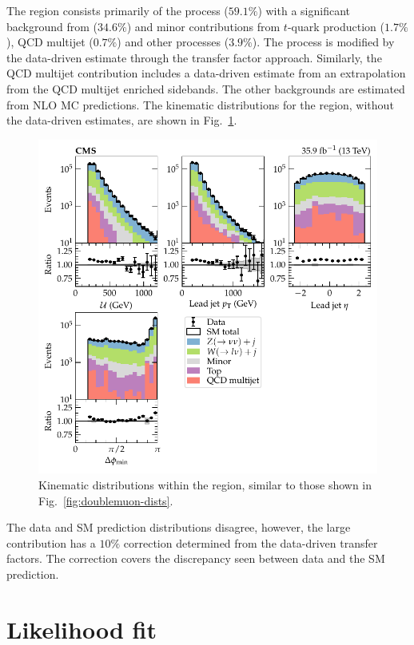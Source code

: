 The \metplusjets region consists primarily of the \IZvvj process ($59.1\%$)
with a significant background from \IWlvj ($34.6\%$) and minor contributions
from $t$-quark production ($1.7\%$), QCD multijet ($0.7\%$) and other
processes ($3.9\%$). The \IWlvj process is modified by the data-driven
estimate through the transfer factor approach. Similarly, the QCD multijet
contribution includes a data-driven estimate from an extrapolation from the
QCD multijet enriched sidebands. The other backgrounds are estimated from NLO
MC predictions. The kinematic distributions for the \metplusjets region,
without the data-driven estimates, are shown in Fig.~\ref{fig:monojet-dists}.
%
\begin{figure}[htb]
    \centering
    \includegraphics{chapters/043_results/images/monojet_dists.pdf}
    \caption[\metplusjets kinematics.]{
        Kinematic distributions within the \metplusjets region, similar to those shown in Fig.~\ref{fig:doublemuon-dists}.
    }
    \label{fig:monojet-dists}
\end{figure}
%
The data and SM prediction distributions disagree, however, the large \IWlvj contribution has a $10\%$ correction determined from the data-driven transfer factors. The correction covers the discrepancy seen between data and the SM prediction.


\section{Likelihood fit}

